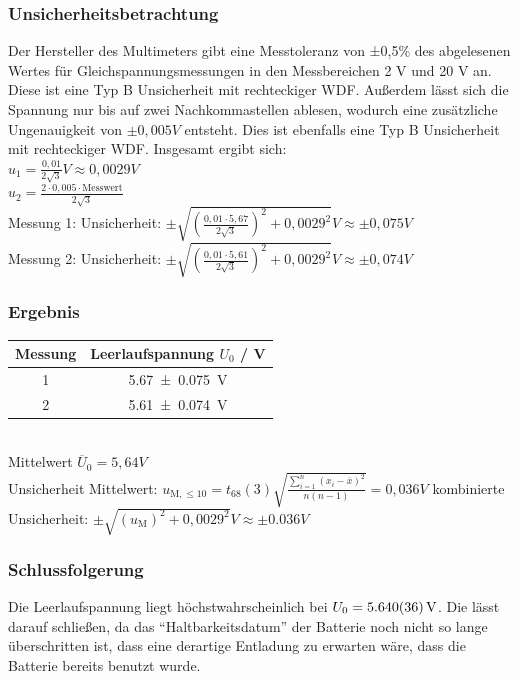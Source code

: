 \documentclass[
	a4paper,
	12pt,
	pagesize,
	ngerman
]{scrartcl}
\begin{document}
	\subsubsection{Unsicherheitsbetrachtung}
	Der Hersteller des Multimeters gibt eine Messtoleranz von ±0,5\% des abgelesenen Wertes für Gleichspannungsmessungen in den Messbereichen 2 V und 20 V an. Diese ist eine Typ B Unsicherheit mit rechteckiger WDF. Außerdem lässt sich die Spannung nur bis auf zwei Nachkommastellen ablesen, wodurch eine zusätzliche Ungenauigkeit von $\pm 0,005\si{V}$ entsteht. Dies ist ebenfalls eine Typ B Unsicherheit mit rechteckiger WDF. Insgesamt ergibt sich: \\
	$u_1= \frac{0,01}{2\sqrt{3}} \si{V} \approx 0,0029 \si{V}$ \\
	$u_2= \frac{2 \cdot 0,005 \cdot \text{Messwert}}{2 \sqrt{3}}$ \\ %
	Messung 1: Unsicherheit: $\pm \sqrt{(\frac{0,01 \cdot 5,67}{2 \sqrt{3}})^2 + 0,0029^2} \si{V} \approx \pm 0,075 \si{V}$ \\
	Messung 2: Unsicherheit: $\pm \sqrt{(\frac{0,01 \cdot 5,61}{2 \sqrt{3}})^2 + 0,0029^2} \si{V} \approx \pm 0,074 \si{V}$ 
	
	\subsubsection{Ergebnis}
	\begin{tabular}{| c | c |}
		\hline
	Messung & Leerlaufspannung $U_0$ / \si{V}\\ \hline
	1 & \SI{5,67 +- 0,075}{\V}\\ %
	2 & \SI{5,61 +- 0,074}{\V}\\ \hline
	\end{tabular} \\
	Mittelwert $\overline{U}_0= 5,64 \si{V}$ \\
	Unsicherheit Mittelwert: $u_{\text{M},\leq10}=t_{68}(3)\sqrt{\frac{\sum_{i=1}^{n} (x_i-\overline{x})^2}{n(n-1)}}=0,036 \si{V}$ \newline
	kombinierte Unsicherheit: $\pm \sqrt{(u_\text{M})^2 + 0,0029^2} \si{V} \approx \pm 0.036 \si{V}$ 
	\subsubsection{Schlussfolgerung}
	Die Leerlaufspannung liegt höchstwahrscheinlich bei $U_0=\SI{5,64 \pm 0.036}{V}$. Die lässt darauf schließen, da das \enquote{Haltbarkeitsdatum} der Batterie noch nicht so lange überschritten ist, dass eine derartige Entladung zu erwarten wäre, dass die Batterie bereits benutzt wurde. %
	
\end{document}
